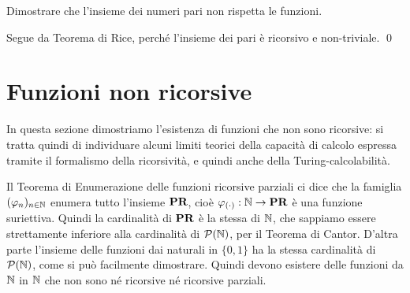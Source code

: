 \documentclass[runningheads,a4paper]{llncs}
\begin{document}
\begin{exercise}
Dimostrare che l'insieme dei numeri pari non rispetta le funzioni.
\end{exercise}

\begin{solution}
Segue da Teorema di Rice, perch\'{e} l'insieme dei pari \`{e} ricorsivo e non-triviale.
\qed\end{solution}


% 
% 
%


\section{Funzioni non ricorsive}

In questa sezione dimostriamo l'esistenza di funzioni che non sono ricorsive: si tratta quindi di individuare alcuni limiti teorici
 della capacit\`{a} di calcolo espressa tramite il formalismo della ricorsivit\`{a}, e quindi anche della Turing-calcolabilit\`{a}.

Il Teorema di Enumerazione delle funzioni ricorsive parziali ci dice che la famiglia $(\varphi_n)_{n \in \mathbb{N}}$ enumera tutto l'insieme
 $\mathbf{PR}$, cio\`{e} $\varphi_{(\cdot)}: \mathbb{N} \to \mathbf{PR}$ \`{e} una funzione suriettiva. Quindi la cardinalit\`{a} di $\mathbf{PR}$ \`{e} la stessa di $\mathbb{N}$,
 che sappiamo essere strettamente inferiore alla cardinalit\`{a} di $\mathcal{P}(\mathbb{N})$, per il Teorema di Cantor. D'altra parte l'insieme
 delle funzioni dai naturali in $\{0,1\}$ ha la stessa cardinalit\`{a} di $\mathcal{P}(\mathbb{N})$, come si pu\`{o} facilmente dimostrare.
 Quindi devono esistere delle funzioni da $\mathbb{N}$ in $\mathbb{N}$ che non sono n\'{e} ricorsive n\'{e} ricorsive parziali.
\end{document}
